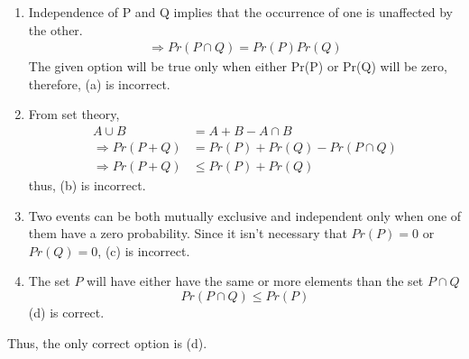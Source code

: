 \documentclass[journal,12pt,twocolumn]{IEEEtran}
\begin{document}
\begin{enumerate}[label = (\alph*)]
    \item Independence of P and Q implies that the occurrence of one is unaffected by the other. 
    \begin{align}
       \Rightarrow Pr(P\cap Q) = Pr(P)Pr(Q)
    \end{align}
    The given option will be true only when either Pr(P) or Pr(Q) will be zero, therefore, (a) is incorrect.\\
    \item From set theory,
    \begin{align}
    A\cup B &= A + B - A\cap B\\
    \Rightarrow Pr(P+Q) &= Pr(P) + Pr(Q) - Pr(P\cap Q)\\
    \Rightarrow Pr(P+Q) &\leq Pr(P) + Pr(Q)
    \end{align}
    thus, (b) is incorrect.\\
    \item Two events can be both mutually exclusive and independent only when one of them have a zero probability. Since it isn't necessary that $Pr(P)=0$ or $Pr(Q)=0$, (c) is incorrect.\\
    \item The set $P$ will have either have the same or more elements than the set $P\cap Q$
    \begin{equation}
        Pr(P\cap Q) \leq Pr(P)
    \end{equation}
    (d) is correct.\\
\end{enumerate}
Thus, the only correct option is (d).
\end{document}
